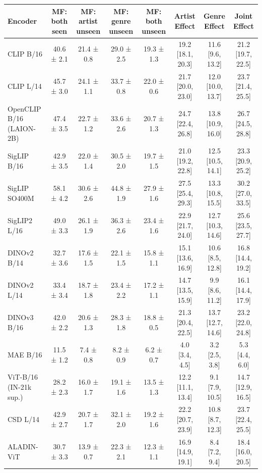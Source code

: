 \begin{tabular}{lccccccc}
\toprule
Encoder & MF: both seen & MF: artist unseen & MF: genre unseen & MF: both unseen & Artist Effect & Genre Effect & Joint Effect \\
\midrule
CLIP B/16 & 40.6 ± 2.1 & 21.4 ± 0.8 & 29.0 ± 2.5 & 19.3 ± 1.3 & 19.2 [18.1, 20.3] & 11.6 [9.6, 13.2] & 21.2 [19.7, 22.5] \\
CLIP L/14 & 45.7 ± 3.0 & 24.1 ± 1.1 & 33.7 ± 0.8 & 22.0 ± 0.6 & 21.7 [20.0, 23.0] & 12.0 [10.0, 13.7] & 23.7 [21.4, 25.5] \\
OpenCLIP B/16 (LAION-2B) & 47.4 ± 3.5 & 22.7 ± 1.2 & 33.6 ± 2.6 & 20.7 ± 1.3 & 24.7 [22.4, 26.8] & 13.8 [10.9, 16.0] & 26.7 [24.5, 28.8] \\
SigLIP B/16 & 42.9 ± 3.5 & 22.0 ± 1.4 & 30.5 ± 2.0 & 19.7 ± 1.5 & 21.0 [19.2, 22.8] & 12.5 [10.5, 14.1] & 23.3 [20.9, 25.2] \\
SigLIP SO400M & 58.1 ± 4.2 & 30.6 ± 2.6 & 44.8 ± 1.9 & 27.9 ± 1.6 & 27.5 [25.4, 29.3] & 13.3 [10.8, 15.5] & 30.2 [27.0, 33.5] \\
SigLIP2 L/16 & 49.0 ± 3.3 & 26.1 ± 1.9 & 36.3 ± 2.6 & 23.4 ± 1.6 & 22.9 [21.7, 24.0] & 12.7 [10.3, 14.6] & 25.6 [23.5, 27.7] \\
DINOv2 B/14 & 32.7 ± 3.6 & 17.6 ± 1.5 & 22.1 ± 1.5 & 15.8 ± 1.1 & 15.1 [13.6, 16.9] & 10.6 [8.5, 12.8] & 16.8 [14.4, 19.2] \\
DINOv2 L/14 & 33.4 ± 3.4 & 18.7 ± 1.8 & 23.4 ± 2.2 & 17.2 ± 1.1 & 14.7 [13.5, 15.9] & 9.9 [8.6, 11.2] & 16.1 [14.4, 17.9] \\
DINOv3 B/16 & 42.0 ± 2.2 & 20.6 ± 1.3 & 28.3 ± 1.8 & 18.8 ± 0.5 & 21.3 [20.4, 22.5] & 13.7 [12.7, 14.6] & 23.2 [22.0, 24.8] \\
MAE B/16 & 11.5 ± 1.2 & 7.4 ± 0.8 & 8.2 ± 0.9 & 6.2 ± 0.7 & 4.0 [3.4, 4.5] & 3.2 [2.5, 3.8] & 5.3 [4.4, 6.0] \\
ViT-B/16 (IN-21k sup.) & 28.2 ± 2.3 & 16.0 ± 1.7 & 19.1 ± 1.6 & 13.5 ± 1.3 & 12.2 [11.1, 13.4] & 9.1 [7.9, 10.5] & 14.7 [12.9, 16.5] \\
CSD L/14 & 42.9 ± 2.7 & 20.7 ± 1.7 & 32.1 ± 2.0 & 19.2 ± 1.6 & 22.2 [20.7, 23.9] & 10.8 [8.7, 12.3] & 23.7 [22.4, 25.5] \\
ALADIN-ViT & 30.7 ± 3.3 & 13.9 ± 0.7 & 22.3 ± 2.1 & 12.3 ± 1.1 & 16.9 [14.9, 19.1] & 8.4 [7.2, 9.4] & 18.4 [16.0, 20.5] \\
\bottomrule
\end{tabular}
